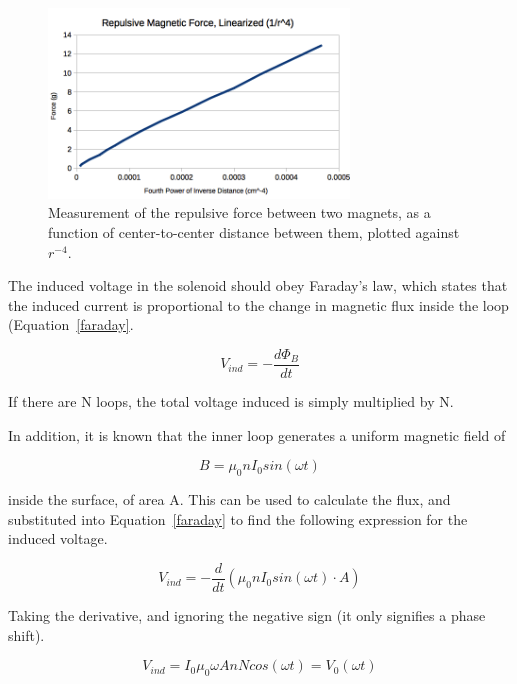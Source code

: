 \documentclass[journal]{IEEEtran}
\begin{document}
\begin{figure}[ht!]
\centering
\includegraphics[width=80mm]{magforce_lin.png}
\caption{Measurement of the repulsive force between two magnets, as a function
of center-to-center distance between them, plotted against $r^{-4}$.}
\label{fig:magforce_lin}
\end{figure}

The induced voltage in the solenoid should obey Faraday's law, which states
that the induced current is proportional to the change in magnetic flux inside
the loop (Equation~\ref{faraday}.

\begin{equation}
\label{faraday}
V_{ind} = -\frac{d \Phi_B}{dt}
\end{equation}

If there are N loops, the total voltage induced is simply multiplied by N.

In addition, it is known that the inner loop generates a uniform magnetic field
of

\begin{displaymath}
B = \mu_0 n I_0 sin(\omega t)
\end{displaymath}

inside the surface, of area A. This can be used to calculate the flux, and
substituted into Equation~\ref{faraday} to find the following expression for
the induced voltage.

\begin{displaymath}
V_{ind} = -\frac{d}{dt} \left( \mu_0 n I_0 sin \left( \omega t \right) \cdot A
\right)
\end{displaymath}

Taking the derivative, and ignoring the negative sign (it only signifies a
phase shift).

\begin{equation}
\label{induced_v}
V_{ind} = I_0 \mu_0 \omega A n N cos \left( \omega t \right) = V_0 \left(
\omega t \right)
\end{equation}
\end{document}
